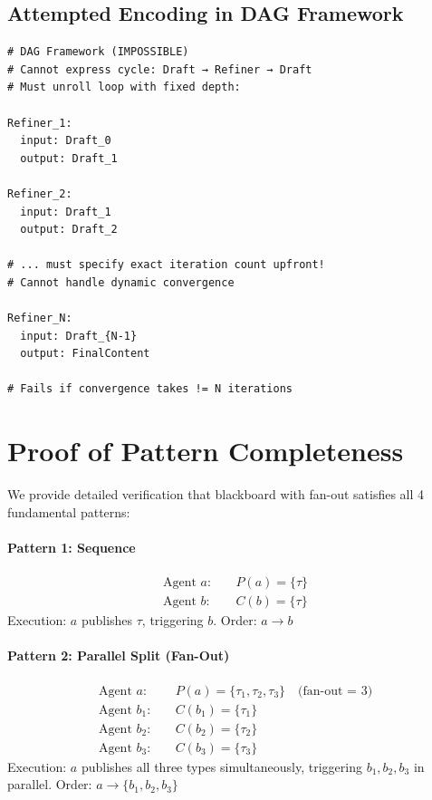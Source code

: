 \documentclass[11pt]{article}
\begin{document}
\subsection{Attempted Encoding in DAG Framework}

\begin{verbatim}
# DAG Framework (IMPOSSIBLE)
# Cannot express cycle: Draft → Refiner → Draft
# Must unroll loop with fixed depth:

Refiner_1:
  input: Draft_0
  output: Draft_1

Refiner_2:
  input: Draft_1
  output: Draft_2

# ... must specify exact iteration count upfront!
# Cannot handle dynamic convergence

Refiner_N:
  input: Draft_{N-1}
  output: FinalContent

# Fails if convergence takes != N iterations
\end{verbatim}

\section{Proof of Pattern Completeness}

We provide detailed verification that blackboard with fan-out satisfies all 4 fundamental patterns:

\paragraph{Pattern 1: Sequence}
\begin{align*}
\text{Agent } a: &\quad P(a) = \{\tau\} \\
\text{Agent } b: &\quad C(b) = \{\tau\}
\end{align*}
Execution: $a$ publishes $\tau$, triggering $b$. Order: $a \rightarrow b$ \checkmark

\paragraph{Pattern 2: Parallel Split (Fan-Out)}
\begin{align*}
\text{Agent } a: &\quad P(a) = \{\tau_1, \tau_2, \tau_3\} \quad \text{(fan-out = 3)} \\
\text{Agent } b_1: &\quad C(b_1) = \{\tau_1\} \\
\text{Agent } b_2: &\quad C(b_2) = \{\tau_2\} \\
\text{Agent } b_3: &\quad C(b_3) = \{\tau_3\}
\end{align*}
Execution: $a$ publishes all three types simultaneously, triggering $b_1, b_2, b_3$ in parallel. Order: $a \rightarrow \{b_1, b_2, b_3\}$ \checkmark
\end{document}
